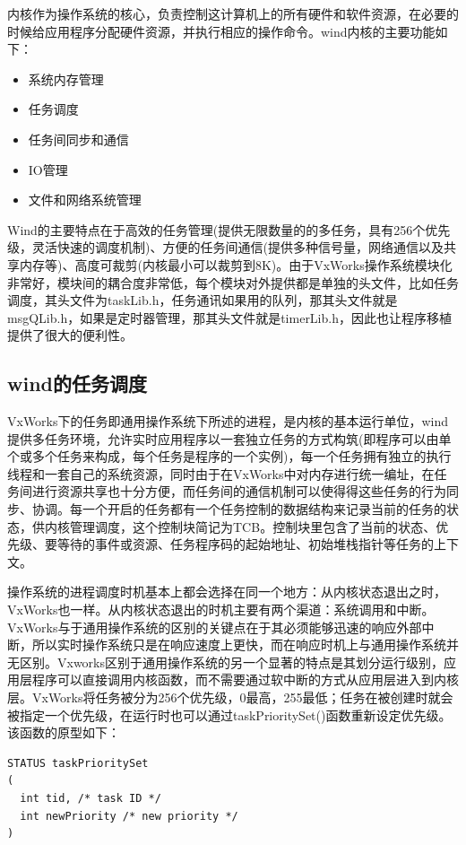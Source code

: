 	内核作为操作系统的核心，负责控制这计算机上的所有硬件和软件资源，在必要的时候给应用程序分配硬件资源，并执行相应的操作命令。wind内核的主要功能如下：
\begin{itemize}
\item 系统内存管理

\item 任务调度

\item 任务间同步和通信

\item IO管理

\item 文件和网络系统管理
\end{itemize}

	Wind的主要特点在于高效的任务管理(提供无限数量的的多任务，具有256个优先级，灵活快速的调度机制)、方便的任务间通信(提供多种信号量，网络通信以及共享内存等)、高度可裁剪(内核最小可以裁剪到8K)。由于VxWorks操作系统模块化非常好，模块间的耦合度非常低，每个模块对外提供都是单独的头文件，比如任务调度，其头文件为taskLib.h，任务通讯如果用的队列，那其头文件就是msgQLib.h，如果是定时器管理，那其头文件就是timerLib.h，因此也让程序移植提供了很大的便利性。

\subsection{wind的任务调度}
	VxWorks下的任务即通用操作系统下所述的进程，是内核的基本运行单位，wind提供多任务环境，允许实时应用程序以一套独立任务的方式构筑(即程序可以由单个或多个任务来构成，每个任务是程序的一个实例)，每一个任务拥有独立的执行线程和一套自己的系统资源，同时由于在VxWorks中对内存进行统一编址，在任务间进行资源共享也十分方便，而任务间的通信机制可以使得得这些任务的行为同步、协调。每一个开启的任务都有一个任务控制的数据结构来记录当前的任务的状态，供内核管理调度，这个控制块简记为TCB。控制块里包含了当前的状态、优先级、要等待的事件或资源、任务程序码的起始地址、初始堆栈指针等任务的上下文。
		
	操作系统的进程调度时机基本上都会选择在同一个地方：从内核状态退出之时，VxWorks也一样。从内核状态退出的时机主要有两个渠道：系统调用和中断。VxWorks与于通用操作系统的区别的关键点在于其必须能够迅速的响应外部中断，所以实时操作系统只是在响应速度上更快，而在响应时机上与通用操作系统并无区别。Vxworks区别于通用操作系统的另一个显著的特点是其划分运行级别，应用层程序可以直接调用内核函数，而不需要通过软中断的方式从应用层进入到内核层。VxWorks将任务被分为256个优先级，0最高，255最低；任务在被创建时就会被指定一个优先级，在运行时也可以通过taskPrioritySet()函数重新设定优先级。该函数的原型如下：
\lstset{language=C}
\begin{lstlisting}
STATUS taskPrioritySet
(
  int tid, /* task ID */
  int newPriority /* new priority */
) 
\end{lstlisting}
	
